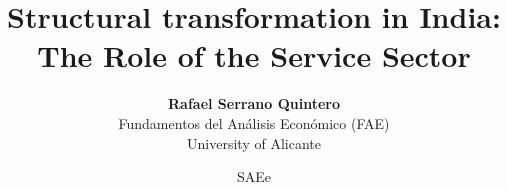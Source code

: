 \documentclass[10pt,xcolor={svgnames}]{beamer}
\begin{document}
\title[]{\textbf{Structural transformation in India: The Role of the Service Sector}}
\author[Rafael Serrano]{\textbf{Rafael Serrano Quintero} \\
Fundamentos del An\'alisis Econ\'omico (FAE) \\
University of Alicante}
\date[]{ SAEe}

\AtBeginSection[]{\frame{\sectionpage}}
\AtBeginSubsection[]{\frame{\subsectionpage}}

\begin{frame}
	\titlepage
\end{frame}
\end{document}
